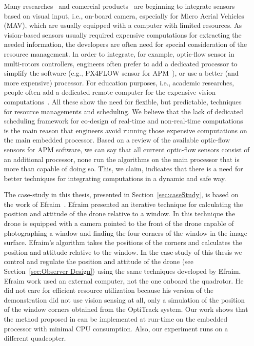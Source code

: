 \documentclass[ twoside, 12pt ]{article}
\begin{document}
Many researches~\cite{Efraim17, Efraim2017, Shlomo, das2002vision, shakernia1999landing, shakernia1999landing, khalil2005optical, ahrens2009vision, bills2011autonomous, blosch2010vision} and comercial products~\cite{APM, bristeau2011navigation} are beginning to integrate sensors based on visual input, i.e., on-board camera, especially for Micro Aerial Vehicles (MAV), which are usually equipped with a computer with limited resources.
As vision-based sensors usually required expensive computations for extracting the needed information, the developers are often need for special consideration of the resource management.
In order to integrate, for example, optic-flow sensor in multi-rotors controllers, engineers often prefer to add a dedicated processor to simplify the software (e.g., PX4FLOW sensor for APM~\cite{APM}), or use a better (and more expensive) processor.
For education purposes, i.e., academic researches, people often add a dedicated remote computer for the expensive vision computations~\cite{Efraim17,Efraim2017}.
All these show the need for flexible, but predictable, techniques for resource managements and scheduling.
We believe that the lack of dedicated scheduling framework for co-design of real-time and non-real-time computations is the main reason that engineers avoid running those expensive computations on the main embedded processor.
Based on a review of the available optic-flow sensors for APM software, we can say that all current optic-flow sensors consist of an additional processor, none run the algorithms on the main processor that is more than capable of doing so. This, we claim, indicates that there is a need for better techniques for integrating computations in a dynamic and safe way.

The case-study in this thesis, presented in Section~\ref{sec:caseStudy}, is based on the work of Efraim~\cite{Efraim17}.
Efraim presented an iterative technique for calculating the position and attitude of the drone relative to a window.
In this technique the drone is equipped with a camera pointed to the front of the drone capable of photographing a window and finding the four corners of the window in the image surface. Efraim's algorithm takes the positions of the corners and calculates the position and attitude relative to the window.
In the case-study of this thesis we control and regulate the position and attitude of the drone (see Section~\ref{sec:Observer Design}) using the same techniques developed by Efraim. Efraim work used an external computer, not the one onboard the quadrotor. He did not care for efficient resource utilization because his version of the demonstration did not use vision sensing at all, only a simulation of the position of the window corners obtained from the OptiTrack system. Our work shows that the method proposed in \cite{Efraim17} can be implemented at run-time on the embedded processor with minimal CPU consumption. Also, our experiment runs on a different quadcopter.
\end{document}
